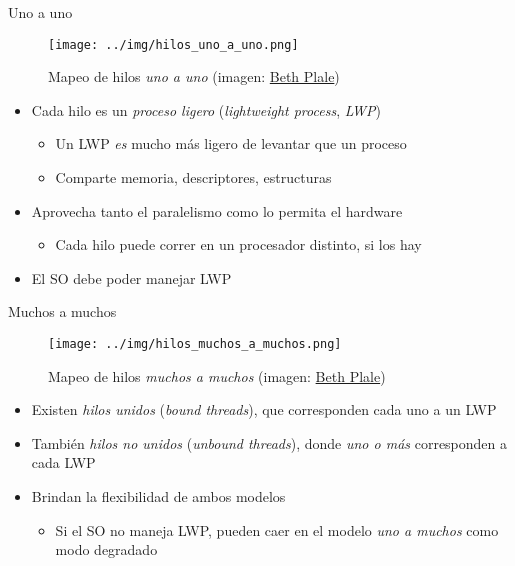 \documentclass[presentation]{beamer}
\begin{document}
\begin{frame}[label={sec:org203f42d}]{Uno a uno}
\begin{figure}[htbp]
\centering
\texttt{[image: ../img/hilos\_uno\_a\_uno.png]}
\caption{Mapeo de hilos \emph{uno a uno} (imagen: \href{http://www.cs.indiana.edu/classes/b534-plal/ClassNotes/sched-synch-details4.pdf}{Beth Plale})}
\end{figure}
\begin{itemize}
\item Cada hilo es un \emph{proceso ligero} (\emph{lightweight process}, \emph{LWP})
\begin{itemize}
\item Un LWP \emph{es} mucho más ligero de levantar que un proceso
\item Comparte memoria, descriptores, estructuras
\end{itemize}
\item Aprovecha tanto el paralelismo como lo permita el hardware
\begin{itemize}
\item Cada hilo puede correr en un procesador distinto, si los hay
\end{itemize}
\item El SO debe poder manejar LWP
\end{itemize}
\end{frame}

\begin{frame}[label={sec:orgdb11fbe}]{Muchos a muchos}
\begin{figure}[htbp]
\centering
\texttt{[image: ../img/hilos\_muchos\_a\_muchos.png]}
\caption{Mapeo de hilos \emph{muchos a muchos} (imagen: \href{http://www.cs.indiana.edu/classes/b534-plal/ClassNotes/sched-synch-details4.pdf}{Beth Plale})}
\end{figure}
\begin{itemize}
\item Existen \emph{hilos unidos} (\emph{bound threads}), que corresponden cada uno
a un LWP
\item También \emph{hilos no unidos} (\emph{unbound threads}), donde \emph{uno o más}
corresponden a cada LWP
\item Brindan la flexibilidad de ambos modelos
\begin{itemize}
\item Si el SO no maneja LWP, pueden caer en el modelo \emph{uno a muchos}
como modo degradado
\end{itemize}
\end{itemize}
\end{frame}
\end{document}
